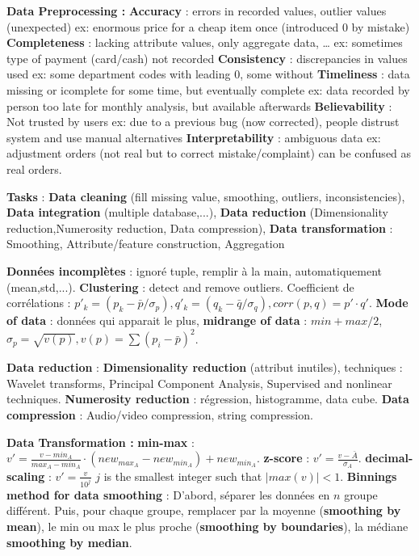 \documentclass[9pt,a4paper]{report}
\author{Sylvain Julmy}
\begin{document}
\textbf{Data Preprocessing :}
\textbf{Accuracy} : errors in recorded values, outlier values (unexpected) ex: enormous price for a cheap item once (introduced 0 by mistake)
\textbf{Completeness} : lacking attribute values, only aggregate data, … ex: sometimes type of payment (card/cash) not recorded
\textbf{Consistency} : discrepancies in values used ex: some department codes with leading 0, some without
\textbf{Timeliness} : data missing or icomplete for some time, but eventually complete ex: data recorded by person too late for monthly analysis, but available afterwards
\textbf{Believability} : Not trusted by users ex: due to a previous bug (now corrected), people distrust system and use manual alternatives
\textbf{Interpretability} : ambiguous data ex: adjustment orders (not real but to correct mistake/complaint) can be confused as real orders.

\textbf{Tasks} : \textbf{Data cleaning} (fill missing value, smoothing, outliers, inconsistencies), \textbf{Data integration} (multiple database,...), \textbf{Data reduction} (Dimensionality reduction,Numerosity reduction, Data compression), \textbf{Data transformation} : Smoothing, Attribute/feature construction, Aggregation

\textbf{Données incomplètes} : ignoré tuple, remplir à la main, automatiquement (mean,std,...). \textbf{Clustering} : detect and remove outliers. Coefficient de corrélations : $p'_k = (p_k-\bar{p}/\sigma_p), q'_k = (q_k-\bar{q}/\sigma_q), corr(p,q)=p'\cdot q'$. \textbf{Mode of data} : données qui apparait le plus, \textbf{midrange of data} : $min + max / 2$, $\sigma_p=\sqrt{v(p)}, v(p)=\sum (p_i-\bar{p})^2$.

\textbf{Data reduction} : \textbf{Dimensionality reduction} (attribut inutiles), techniques : Wavelet transforms, Principal Component Analysis, Supervised and nonlinear techniques. \textbf{Numerosity reduction} : régression, histogramme, data cube. \textbf{Data compression} : Audio/video compression, string compression.

\textbf{Data Transformation :} \textbf{min-max} : $v'=\frac{v - min_A}{max_A - min_A}\cdot (new_{max_A} - new_{min_A})+new_{min_A}$. \textbf{z-score} : $v'=\frac{v-\bar{A}}{\sigma_A}$. \textbf{decimal-scaling} : $v'=\frac{v}{10^j}$  $j$ is the smallest integer such that $|max(v)| < 1$. \textbf{Binnings method for data smoothing} : D'abord, séparer les données en $n$ groupe différent. Puis, pour chaque groupe, remplacer par la moyenne (\textbf{smoothing by mean}), le min ou max le plus proche (\textbf{smoothing by boundaries}), la médiane \textbf{smoothing by median}.
\end{document}
